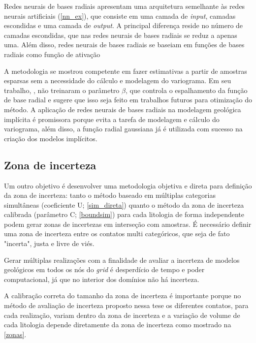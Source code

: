 Redes neurais de bases radiais apresentam uma arquitetura semelhante às redes neurais artificiais (\autoref{nn_ex}), que consiste em uma camada de \textit{input}, camadas escondidas e uma camada de \textit{output}. A principal diferença reside no número de camadas escondidas, que nas redes neurais de bases radiais se reduz a apenas uma. Além disso, redes neurais de bases radiais se baseiam em funções de bases radiais como função de ativação 

A metodologia se mostrou competente em fazer estimativas a partir de amostras esparsas sem a necessidade do cálculo e modelagem do variograma. Em seu trabalho, , não treinaram o parâmetro $\beta$, que controla o espalhamento da função de base radial e sugere que isso seja feito em trabalhos futuros para otimização do método. A aplicação de redes neurais de bases radiais na modelagem geológica implícita é promissora porque evita a tarefa de modelagem e cálculo do variograma, além disso, a função radial gaussiana já é utilizada com sucesso na criação dos modelos implícitos. 

\subsection{Zona de incerteza}

Um outro objetivo é desenvolver uma metodologia objetiva e direta para definição da zona de incerteza: tanto o método baseado em múltiplas categorias simultâneas (coeficiente U; \autoref{sim_direta}) quanto o método da zona de incerteza calibrada (parâmetro C; \autoref{boundsim}) para cada litologia de forma independente podem gerar zonas de incertezas em interseção com amostras. É necessário definir uma zona de incerteza entre os contatos multi categóricos, que seja de fato "incerta", justa e livre de viés. 

Gerar múltiplas realizações com a finalidade de avaliar a incerteza de modelos geológicos em todos os nós do \textit{grid} é desperdício de tempo e poder computacional, já que no interior dos domínios não há incerteza. 

A calibração correta do tamanho da zona de incerteza é importante porque no método de avaliação de incerteza proposto nessa tese os diferentes contatos, para cada realização, variam dentro da zona de incerteza e a variação de volume de cada litologia depende diretamente da zona de incerteza como mostrado na \autoref{zonas}.

